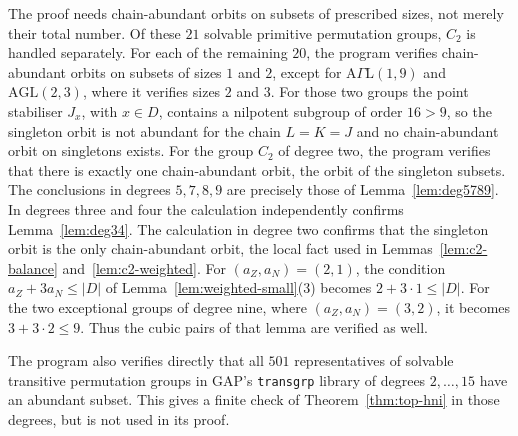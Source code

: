 \documentclass[10pt]{amsart}
\theoremstyle{definition}
\renewcommand{\le}{\leqslant}
\newcommand{\GAP}{\textsf{GAP}}
\numberwithin{equation}{section}
\numberwithin{table}{section}
\begin{document}
The proof needs chain-abundant orbits on subsets of prescribed sizes, not
merely their total number. Of these $21$ solvable primitive permutation
groups, $C_2$ is handled separately. For each of the remaining $20$, the
program verifies chain-abundant orbits on subsets of sizes $1$ and $2$, except
for $\mathrm{A}\Gamma\mathrm{L}(1,9)$ and $\mathrm{AGL}(2,3)$, where it verifies sizes
$2$ and $3$. For those two groups the point stabiliser $J_x$, with $x\in D$,
contains a nilpotent subgroup of order $16>9$, so the singleton orbit is not
abundant for the chain $L=K=J$ and no chain-abundant orbit on singletons exists. For the group $C_2$ of degree two,
the program verifies that there is exactly one chain-abundant orbit, the
orbit of the singleton subsets. The conclusions in degrees $5,7,8,9$ are
precisely those of Lemma~\ref{lem:deg5789}. In degrees three and four the
calculation independently confirms Lemma~\ref{lem:deg34}. The calculation in
degree two confirms that the singleton orbit is the only chain-abundant
orbit, the local fact used in Lemmas~\ref{lem:c2-balance}
and~\ref{lem:c2-weighted}. For
$(a_Z,a_N)=(2,1)$, the condition $a_Z+3a_N\le|D|$ of
Lemma~\ref{lem:weighted-small}(3) becomes $2+3\cdot1\le|D|$. For the two
exceptional groups of degree nine, where $(a_Z,a_N)=(3,2)$, it becomes
$3+3\cdot2\le9$. Thus the cubic pairs of that lemma are verified as well.

The program also verifies directly that all $501$ representatives of solvable
transitive permutation groups in \GAP{}'s \texttt{transgrp} library of
degrees $2,\ldots,15$ have an
abundant subset. This gives a finite check of Theorem~\ref{thm:top-hni} in
those degrees, but is not used in its proof.
\end{document}
